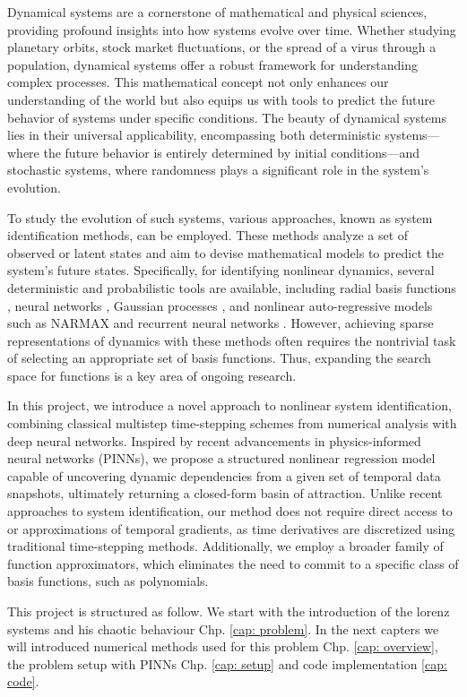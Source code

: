 Dynamical systems are a cornerstone of mathematical and physical sciences, providing profound insights into how systems evolve over time. Whether studying planetary orbits, stock market fluctuations, or the spread of a virus through a population, dynamical systems offer a robust framework for understanding complex processes. This mathematical concept not only enhances our understanding of the world but also equips us with tools to predict the future behavior of systems under specific conditions. The beauty of dynamical systems lies in their universal applicability, encompassing both deterministic systems—where the future behavior is entirely determined by initial conditions—and stochastic systems, where randomness plays a significant role in the system's evolution.

To study the evolution of such systems, various approaches, known as system identification methods, can be employed. These methods analyze a set of observed or latent states and aim to devise mathematical models to predict the system’s future states. Specifically, for identifying nonlinear dynamics, several deterministic and probabilistic tools are available, including radial basis functions \cite{Chen1990Non-linear}, neural networks \cite{cochocki1993neural}, Gaussian processes \cite{kocijan2005dynamic} \cite{raissi2017hidden} \cite{raissi2017inferring} \cite{raissi2017machine} \cite{raissi2017numerical}, and nonlinear auto-regressive models such as NARMAX \cite{billings2013nonlinear} and recurrent neural networks \cite{goodfellow2016deep}. However, achieving sparse representations of dynamics with these methods often requires the nontrivial task of selecting an appropriate set of basis functions. Thus, expanding the search space for functions is a key area of ongoing research.

In this project, we introduce a novel approach to nonlinear system identification, combining classical multistep time-stepping schemes from numerical analysis with deep neural networks. Inspired by recent advancements in physics-informed neural networks (PINNs), we propose a structured nonlinear regression model capable of uncovering dynamic dependencies from a given set of temporal data snapshots, ultimately returning a closed-form basin of attraction. Unlike recent approaches to system identification, our method does not require direct access to or approximations of temporal gradients, as time derivatives are discretized using traditional time-stepping methods. Additionally, we employ a broader family of function approximators, which eliminates the need to commit to a specific class of basis functions, such as polynomials.

This project is structured as follow. We start with the introduction of the lorenz systems and his chaotic behaviour Chp. \ref{cap: problem}.
In the next capters we will introduced numerical methods used for this problem Chp. \ref{cap: overview}, the problem setup with PINNs Chp. \ref{cap: setup} and code implementation \ref{cap: code}. 

